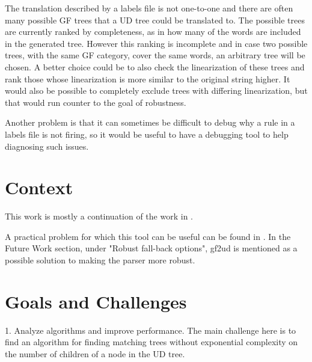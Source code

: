 \documentclass{article}
\begin{document}
The translation described by a labels file is not one-to-one and there are often many possible GF trees that a UD tree could be translated to. The possible trees are currently ranked by completeness, as in how many of the words are included in the generated tree. However this ranking is incomplete and in case two possible trees, with the same GF category, cover the same words, an arbitrary tree will be chosen. A better choice could be to also check the linearization of these trees and rank those whose linearization is more similar to the original string higher. It would also be possible to completely exclude trees with differing linearization, but that would run counter to the goal of robustness.

Another problem is that it can sometimes be difficult to debug why a rule in a labels file is not firing, so it would be useful to have a debugging tool to help diagnosing such issues.




\section{Context}

This work is mostly a continuation of the work in \cite{kolachina-ranta-2017}.

A practical problem for which this tool can be useful can be found in \cite{listenmaa-etal-2021-towards}. In the Future Work section, under "Robust fall-back options", gf2ud is mentioned as a possible solution to making the parser more robust.



\section{Goals and Challenges}

1. Analyze algorithms and improve performance. The main challenge here is to find an algorithm for finding matching trees without exponential complexity on the number of children of a node in the UD tree.
\end{document}
